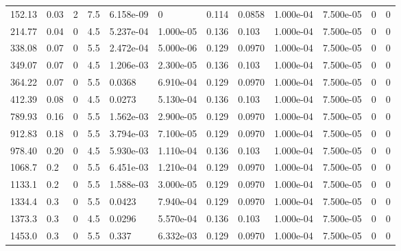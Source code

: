 \documentclass[preview]{standalone}
\begin{document}
{{\begin{tabular}{L{1.2cm}C{1.2cm} C{0.3cm}C{0.5cm} C{1.4cm}C{1.4cm} C{1.4cm}C{1.4cm} C{1.6cm}C{1.6cm} C{1.6cm}C{1.6cm}}
  152.13  &  0.03  & 2     & 7.5 &  6.158e-09  & 0  &  0.114&   0.0858& 1.000e-04 & 7.500e-05   &  0 & 0  \\ 
  214.77  &  0.04  & 0     & 4.5 &  5.237e-04  & 1.000e-05  &  0.136&   0.103& 1.000e-04 & 7.500e-05   &  0 & 0  \\ 
  338.08  &  0.07  & 0     & 5.5 &  2.472e-04  & 5.000e-06  &  0.129&   0.0970& 1.000e-04 & 7.500e-05   &  0 & 0  \\ 
  349.07  &  0.07  & 0     & 4.5 &  1.206e-03  & 2.300e-05  &  0.136&   0.103& 1.000e-04 & 7.500e-05   &  0 & 0  \\ 
  364.22  &  0.07  & 0     & 5.5 &  0.0368  & 6.910e-04  &  0.129&   0.0970& 1.000e-04 & 7.500e-05   &  0 & 0  \\ 
  412.39  &  0.08  & 0     & 4.5 &  0.0273  & 5.130e-04  &  0.136&   0.103& 1.000e-04 & 7.500e-05   &  0 & 0  \\ 
  789.93  &  0.16  & 0     & 5.5 &  1.562e-03  & 2.900e-05  &  0.129&   0.0970& 1.000e-04 & 7.500e-05   &  0 & 0  \\ 
  912.83  &  0.18  & 0     & 5.5 &  3.794e-03  & 7.100e-05  &  0.129&   0.0970& 1.000e-04 & 7.500e-05   &  0 & 0  \\ 
  978.40  &  0.20  & 0     & 4.5 &  5.930e-03  & 1.110e-04  &  0.136&   0.103& 1.000e-04 & 7.500e-05   &  0 & 0  \\ 
  1068.7  &   0.2  & 0     & 5.5 &  6.451e-03  & 1.210e-04  &  0.129&   0.0970& 1.000e-04 & 7.500e-05   &  0 & 0  \\ 
  1133.1  &   0.2  & 0     & 5.5 &  1.588e-03  & 3.000e-05  &  0.129&   0.0970& 1.000e-04 & 7.500e-05   &  0 & 0  \\ 
  1334.4  &   0.3  & 0     & 5.5 &  0.0423  & 7.940e-04  &  0.129&   0.0970& 1.000e-04 & 7.500e-05   &  0 & 0  \\ 
  1373.3  &   0.3  & 0     & 4.5 &  0.0296  & 5.570e-04  &  0.136&   0.103& 1.000e-04 & 7.500e-05   &  0 & 0  \\ 
  1453.0  &   0.3  & 0     & 5.5 &  0.337  & 6.332e-03  &  0.129&   0.0970& 1.000e-04 & 7.500e-05   &  0 & 0  \\ 
\hline 
\end{tabular} 

}}
\end{document}
